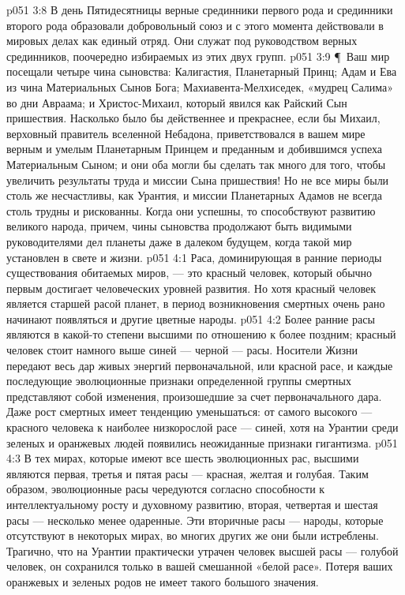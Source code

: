 \vs p051 3:8 В день Пятидесятницы верные срединники первого рода и срединники второго рода образовали добровольный союз и с этого момента действовали в мировых делах как единый отряд. Они служат под руководством верных срединников, поочередно избираемых из этих двух групп.
\vs p051 3:9 \P\ Ваш мир посещали четыре чина сыновства: Калигастия, Планетарный Принц; Адам и Ева из чина Материальных Сынов Бога; Махиавента\hyp{}Мелхиседек, «мудрец Салима» во дни Авраама; и Христос\hyp{}Михаил, который явился как Райский Сын пришествия. Насколько было бы действеннее и прекраснее, если бы Михаил, верховный правитель вселенной Небадона, приветствовался в вашем мире верным и умелым Планетарным Принцем и преданным и добившимся успеха Материальным Сыном; и они оба могли бы сделать так много для того, чтобы увеличить результаты труда и миссии Сына пришествия! Но не все миры были столь же несчастливы, как Урантия, и миссии Планетарных Адамов не всегда столь трудны и рискованны. Когда они успешны, то способствуют развитию великого народа, причем, чины сыновства продолжают быть видимыми руководителями дел планеты даже в далеком будущем, когда такой мир установлен в свете и жизни.
\vs p051 4:1 Раса, доминирующая в ранние периоды существования обитаемых миров, --- это красный человек, который обычно первым достигает человеческих уровней развития. Но хотя красный человек является старшей расой планет, в период возникновения смертных очень рано начинают появляться и другие цветные народы.
\vs p051 4:2 Более ранние расы являются в какой\hyp{}то степени высшими по отношению к более поздним; красный человек стоит намного выше синей --- черной --- расы. Носители Жизни передают весь дар живых энергий первоначальной, или красной расе, и каждые последующие эволюционные признаки определенной группы смертных представляют собой изменения, произошедшие за счет первоначального дара. Даже рост смертных имеет тенденцию уменьшаться: от самого высокого --- красного человека к наиболее низкорослой расе --- синей, хотя на Урантии среди зеленых и оранжевых людей появились неожиданные признаки гигантизма.
\vs p051 4:3 В тех мирах, которые имеют все шесть эволюционных рас, высшими являются первая, третья и пятая расы --- красная, желтая и голубая. Таким образом, эволюционные расы чередуются согласно способности к интеллектуальному росту и духовному развитию, вторая, четвертая и шестая расы --- несколько менее одаренные. Эти вторичные расы --- народы, которые отсутствуют в некоторых мирах, во многих других же они были истреблены. Трагично, что на Урантии практически утрачен человек высшей расы --- голубой человек, он сохранился только в вашей смешанной «белой расе». Потеря ваших оранжевых и зеленых родов не имеет такого большого значения.
